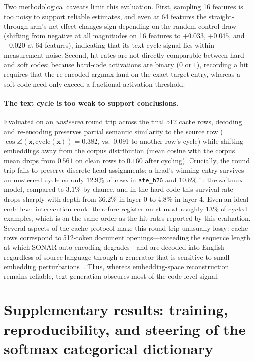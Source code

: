 Two methodological caveats limit this evaluation. First, sampling 16
features is too noisy to support reliable estimates, and even at 64
features the straight-through arm's net effect changes sign depending on
the random control draw (shifting from negative at all magnitudes on 16
features to $+0.033$, $+0.045$, and $-0.020$ at 64 features), indicating
that its text-cycle signal lies within measurement noise. Second, hit
rates are not directly comparable between hard and soft codes: because
hard-code activations are binary ($0$ or $1$), recording a hit requires
that the re-encoded argmax land on the exact target entry, whereas a soft
code need only exceed a fractional activation threshold.

\paragraph{The text cycle is too weak to support conclusions.} Evaluated
on an \emph{unsteered} round trip across the final 512 cache rows,
decoding and re-encoding preserves partial semantic similarity to the
source row ($\cos\angle(\mathbf{x}, \mathrm{cycle}(\mathbf{x})) = 0.382$,
vs.\ $0.091$ to another row's cycle) while shifting embeddings away from
the corpus distribution (mean cosine with the corpus mean drops from
$0.561$ on clean rows to $0.160$ after cycling). Crucially, the round trip
fails to preserve discrete head assignments: a head's winning entry
survives an unsteered cycle on only $12.9\%$ of rows in
\texttt{ste\_h76} and $10.8\%$ in the softmax model, compared to $3.1\%$
by chance, and in the hard code this survival rate drops sharply with
depth from $36.2\%$ in layer 0 to $4.8\%$ in layer 4. Even an ideal
code-level intervention could therefore register on at most roughly
$13\%$ of cycled examples, which is on the same order as the hit rates
reported by this evaluation. Several aspects of the cache protocol make
this round trip unusually lossy: cache rows correspond to 512-token
document openings---exceeding the sequence length at which SONAR
auto-encoding degrades---and are decoded into English regardless of source
language through a generator that is sensitive to small embedding
perturbations~\cite{lcmteam2024largeconceptmodelslanguage}. Thus, whereas
embedding-space reconstruction remains reliable, text generation obscures
most of the code-level signal.

\section{Supplementary results: training, reproducibility, and steering of the softmax categorical dictionary}
\label{app:softdyn}


